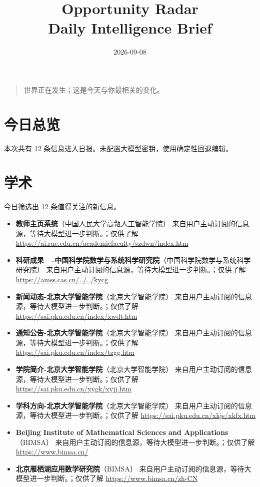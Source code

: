 \documentclass[11pt]{ctexart}
\title{Opportunity Radar\\Daily Intelligence Brief}
\date{2026-09-08}
\begin{document}
\maketitle
\begin{quote}\Large 世界正在发生；这是今天与你最相关的变化。\end{quote}
\section*{今日总览}
本次共有 12 条信息进入日报。未配置大模型密钥，使用确定性回退编辑。
\section*{学术}
今日筛选出 12 条值得关注的新信息。
\begin{itemize}
\item \textbf{教师主页系统}（中国人民大学高瓴人工智能学院） 来自用户主动订阅的信息源，等待大模型进一步判断。；仅供了解 \url{https://ai.ruc.edu.cn/academicfaculty/szdwn/index.htm}
\item \textbf{科研成果----中国科学院数学与系统科学研究院}（中国科学院数学与系统科学研究院） 来自用户主动订阅的信息源，等待大模型进一步判断。；仅供了解 \url{https://amss.cas.cn/../../kycg}
\item \textbf{新闻动态-北京大学智能学院}（北京大学智能学院） 来自用户主动订阅的信息源，等待大模型进一步判断。；仅供了解 \url{https://sai.pku.edu.cn/index/xwdt.htm}
\item \textbf{通知公告-北京大学智能学院}（北京大学智能学院） 来自用户主动订阅的信息源，等待大模型进一步判断。；仅供了解 \url{https://sai.pku.edu.cn/index/tzgg.htm}
\item \textbf{学院简介-北京大学智能学院}（北京大学智能学院） 来自用户主动订阅的信息源，等待大模型进一步判断。；仅供了解 \url{https://sai.pku.edu.cn/xygk/xyjj.htm}
\item \textbf{学科方向-北京大学智能学院}（北京大学智能学院） 来自用户主动订阅的信息源，等待大模型进一步判断。；仅供了解 \url{https://sai.pku.edu.cn/xkjs/xkfx.htm}
\item \textbf{Beijing Institute of Mathematical Sciences and Applications}（BIMSA） 来自用户主动订阅的信息源，等待大模型进一步判断。；仅供了解 \url{https://www.bimsa.cn/}
\item \textbf{北京雁栖湖应用数学研究院}（BIMSA） 来自用户主动订阅的信息源，等待大模型进一步判断。；仅供了解 \url{https://www.bimsa.cn/zh-CN}
\end{itemize}
\end{document}
